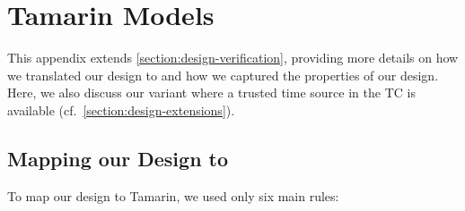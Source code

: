 \section{Tamarin Models}
\label{appendix:tamarin}

This appendix extends \cref{section:design-verification}, providing more details
on how we translated our design to \tamarin{} and how we captured the properties
of our design. Here, we also discuss our variant where a trusted time source in
the \ac{TC} is available (cf.~\cref{section:design-extensions}).

\subsection{Mapping our Design to \tamarin{}}

To map our design to Tamarin, we used only six main rules:
%
